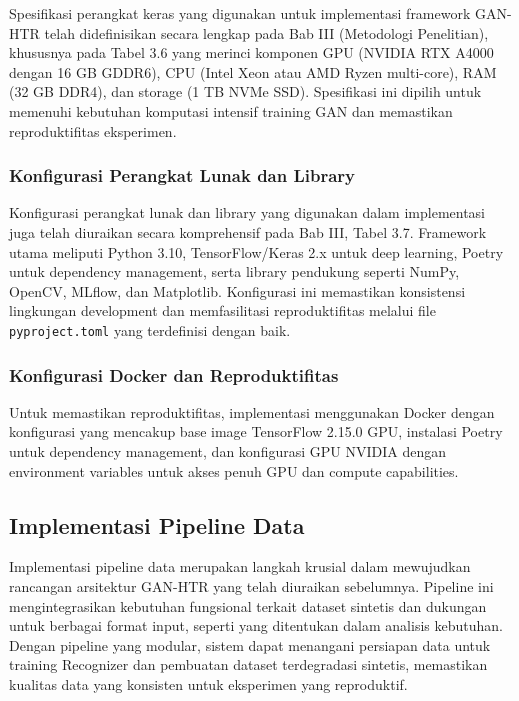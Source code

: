 \documentclass[12pt,a4paper]{article}
\begin{document}
Spesifikasi perangkat keras yang digunakan untuk implementasi framework GAN-HTR telah didefinisikan secara lengkap pada Bab III (Metodologi Penelitian), khususnya pada Tabel 3.6 yang merinci komponen GPU (NVIDIA RTX A4000 dengan 16 GB GDDR6), CPU (Intel Xeon atau AMD Ryzen multi-core), RAM (32 GB DDR4), dan storage (1 TB NVMe SSD). Spesifikasi ini dipilih untuk memenuhi kebutuhan komputasi intensif training GAN dan memastikan reproduktifitas eksperimen.

\subsubsection{Konfigurasi Perangkat Lunak dan Library}
\label{subsubsec:software-spec}

Konfigurasi perangkat lunak dan library yang digunakan dalam implementasi juga telah diuraikan secara komprehensif pada Bab III, Tabel 3.7. Framework utama meliputi Python 3.10, TensorFlow/Keras 2.x untuk deep learning, Poetry untuk dependency management, serta library pendukung seperti NumPy, OpenCV, MLflow, dan Matplotlib. Konfigurasi ini memastikan konsistensi lingkungan development dan memfasilitasi reproduktifitas melalui file \texttt{pyproject.toml} yang terdefinisi dengan baik.

\subsubsection{Konfigurasi Docker dan Reproduktifitas}
\label{subsubsec:docker-config}

Untuk memastikan reproduktifitas, implementasi menggunakan Docker dengan konfigurasi yang mencakup base image TensorFlow 2.15.0 GPU, instalasi Poetry untuk dependency management, dan konfigurasi GPU NVIDIA dengan environment variables untuk akses penuh GPU dan compute capabilities.

\subsection{Implementasi Pipeline Data}
\label{subsec:implementasi-pipeline}

Implementasi pipeline data merupakan langkah krusial dalam mewujudkan rancangan arsitektur GAN-HTR yang telah diuraikan sebelumnya. Pipeline ini mengintegrasikan kebutuhan fungsional terkait dataset sintetis dan dukungan untuk berbagai format input, seperti yang ditentukan dalam analisis kebutuhan. Dengan pipeline yang modular, sistem dapat menangani persiapan data untuk training Recognizer dan pembuatan dataset terdegradasi sintetis, memastikan kualitas data yang konsisten untuk eksperimen yang reproduktif.
\end{document}
